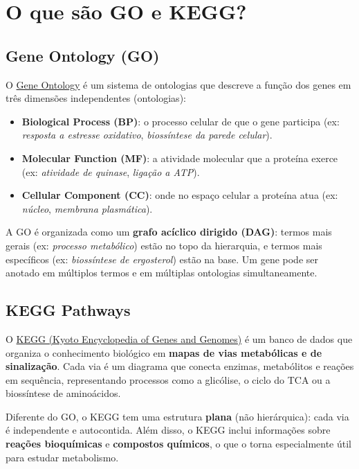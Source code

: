 \documentclass[
  letterpaper,
  DIV=11,
  numbers=noendperiod]{scrreprt}
\providecommand{\tightlist}{%
  \setlength{\itemsep}{0pt}\setlength{\parskip}{0pt}}
\begin{document}
\section{O que são GO e KEGG?}\label{o-que-suxe3o-go-e-kegg}

\subsection{Gene Ontology (GO)}\label{gene-ontology-go}

O \href{http://geneontology.org/}{Gene Ontology} é um sistema de
ontologias que descreve a função dos genes em três dimensões
independentes (ontologias):

\begin{itemize}
\tightlist
\item
  \textbf{Biological Process (BP)}: o processo celular de que o gene
  participa (ex: \emph{resposta a estresse oxidativo}, \emph{biossíntese
  da parede celular}).
\item
  \textbf{Molecular Function (MF)}: a atividade molecular que a proteína
  exerce (ex: \emph{atividade de quinase}, \emph{ligação a ATP}).
\item
  \textbf{Cellular Component (CC)}: onde no espaço celular a proteína
  atua (ex: \emph{núcleo}, \emph{membrana plasmática}).
\end{itemize}

A GO é organizada como um \textbf{grafo acíclico dirigido (DAG)}: termos
mais gerais (ex: \emph{processo metabólico}) estão no topo da
hierarquia, e termos mais específicos (ex: \emph{biossíntese de
ergosterol}) estão na base. Um gene pode ser anotado em múltiplos termos
e em múltiplas ontologias simultaneamente.

\subsection{KEGG Pathways}\label{kegg-pathways}

O \href{https://www.kegg.jp/}{KEGG (Kyoto Encyclopedia of Genes and
Genomes)} é um banco de dados que organiza o conhecimento biológico em
\textbf{mapas de vias metabólicas e de sinalização}. Cada via é um
diagrama que conecta enzimas, metabólitos e reações em sequência,
representando processos como a glicólise, o ciclo do TCA ou a
biossíntese de aminoácidos.

Diferente do GO, o KEGG tem uma estrutura \textbf{plana} (não
hierárquica): cada via é independente e autocontida. Além disso, o KEGG
inclui informações sobre \textbf{reações bioquímicas} e
\textbf{compostos químicos}, o que o torna especialmente útil para
estudar metabolismo.
\end{document}
